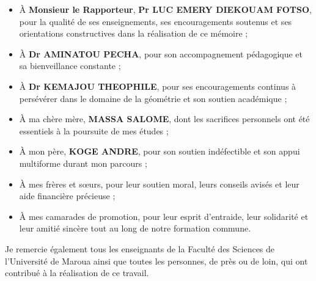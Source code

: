 \documentclass[a4paper, 14pt]{report}
\newcommand{\applyfontsize}{%
	\fontsize{12}{12}\selectfont
}
\begin{document}
\begin{onehalfspace}
{\begin{itemize}
	\item À \textbf{Monsieur le Rapporteur}, \textbf{Pr LUC EMERY DIEKOUAM FOTSO}, pour la qualité de ses enseignements, ses encouragements soutenus et ses orientations constructives dans la réalisation de ce mémoire ;
	
	\item À \textbf{Dr AMINATOU PECHA}, pour son accompagnement pédagogique et sa bienveillance constante ;
	
	\item À \textbf{Dr KEMAJOU THEOPHILE}, pour ses encouragements continus à persévérer dans le domaine de la géométrie et son soutien académique ;
	
	\item À ma chère mère, \textbf{MASSA SALOME}, dont les sacrifices personnels ont été essentiels à la poursuite de mes études ;
	
	\item À mon père, \textbf{KOGE ANDRE}, pour son soutien indéfectible et son appui multiforme durant mon parcours ;
	
	\item À mes frères et sœurs, pour leur soutien moral, leurs conseils avisés et leur aide financière précieuse ;
	
	\item À mes camarades de promotion, pour leur esprit d’entraide, leur solidarité et leur amitié sincère tout au long de notre formation commune.
\end{itemize}


Je remercie également tous les enseignants de la Faculté des Sciences de l’Université de Maroua ainsi que toutes les personnes, de près ou de loin, qui ont contribué à la réalisation de ce travail.


}

{
	\applyfontsize %
	
\tableofcontents
}



\end{onehalfspace}
\end{document}
